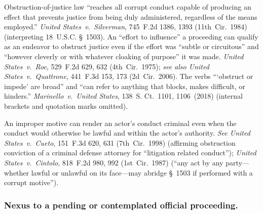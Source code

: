 Obstruction-of-justice law ``reaches all corrupt conduct capable of producing an effect that prevents justice from being duly administered, regardless of the means employed.''
\textit{United States~v.\ Silverman}, 745~F.2d 1386, 1393 (11th~Cir.~1984) (interpreting 18~U.S.C. \S~1503).
An ``effort to influence'' a proceeding can qualify as an endeavor to obstruct justice even if the effort was ``subtle or circuitous'' and ``however cleverly or with whatever cloaking of purpose'' it was made.
\textit{United States~v.\ Roe}, 529~F.2d 629, 632 (4th~Cir.~1975);
\textit{see also United States~v.\ Quattrone}, 441~F.3d 153, 173 (2d~Cir.~2006).
The verbs ``\thinspace`obstruct or impede' are broad'' and ``can refer to anything that blocks, makes difficult, or hinders.''
\textit{Marinello~v.\ United States}, 138~S. Ct.~1101, 1106~(2018) (internal brackets and quotation marks omitted).

An improper motive can render an actor's conduct criminal even when the conduct would otherwise be lawful and within the actor's authority.
\textit{See United States~v.\ Cueto}, 151~F.3d 620, 631 (7th~Cir.~1998) (affirming obstruction conviction of a criminal defense attorney for ``litigation related conduct''); \textit{United States~v.\ Cintolo}, 818~F.2d 980, 992 (1st~Cir.~1987) (``any act by any party---whether lawful or unlawful on its face---may abridge \S~1503 if performed with a corrupt motive'').

\subsubsection*{Nexus to a pending or contemplated official proceeding.}

